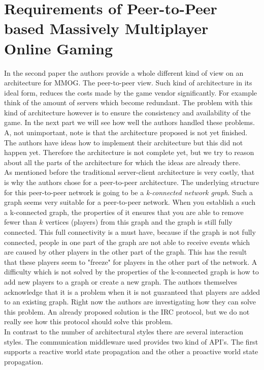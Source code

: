 \section*{Requirements of Peer-to-Peer based Massively Multiplayer Online Gaming}
In the second paper the authors \cite{peer} provide a whole different kind of view on an architecture for MMOG. 
The peer-to-peer view. 
Such kind of architecture in its ideal form, reduces the costs made by the game vendor significantly. 
For example think of the amount of servers which become redundant. 
The problem with this kind of architecture however is to ensure the consistency and availability of the game. 
In the next part we will see how well the authors handled these problems. 
A, not unimportant, note is that the architecture proposed is not yet finished. 
The authors have ideas how to implement their architecture but this did not happen yet. 
Therefore the architecture is not complete yet, but we try to reason about all the parts of the architecture for which the ideas are already there.\\
\indent As mentioned before the traditional server-client architecture is very costly, that is why the authors chose for a peer-to-peer architecture. 
The underlying structure for this peer-to-peer network is going to be a \emph{k-connected network graph}. 
Such a graph seems very suitable for a peer-to-peer network. 
When you establish a such a k-connected graph, the properties of it ensures that you are able to remove fewer than $k$ vertices (players) from this graph and the graph is still fully connected. 
This full connectivity is a must have, because if the graph is not fully connected, people in one part of the graph are not able to receive events which are caused by other players in the other part of the graph.
This has the result that these players seem to "freeze" for players in the other part of the network. 
A difficulty which is not solved by the properties of the k-connected graph is how to add new players to a graph or create a new graph. 
The authors themselves acknowledge that it is a problem when it is not guaranteed that players are added to an existing graph. 
Right now the authors are investigating how they can solve this problem. 
An already proposed solution is the IRC protocol, but we do not really see how this protocol should solve this problem.\\
\indent In contrast to the number of architectural styles there are several interaction styles. 
The communication middleware used provides two kind of API's. 
The first supports a reactive world state propagation and the other a proactive world state propagation. 
